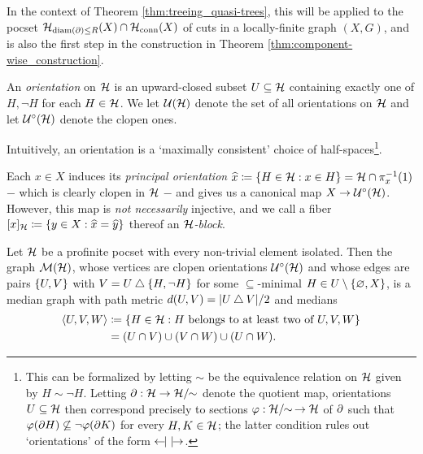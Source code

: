 \documentclass[reqno]{amsart}
\begin{document}
    In the context of Theorem \ref{thm:treeing_quasi-trees}, this will be applied to the pocset $\mathcal{H}_{\operatorname{diam}(\partial)\leq R}(X)\cap\mathcal{H}_\mathrm{conn}(X)$ of cuts in a locally-finite graph $(X,G)$, and is also the first step in the construction in Theorem \ref{thm:component-wise_construction}.
    
    \begin{definition}\label{def:orientation}
        An \textit{orientation} on $\mathcal{H}$ is an upward-closed subset $U\subseteq\mathcal{H}$ containing exactly one of $H,\lnot H$ for each $H\in\mathcal{H}$. We let $\mathcal{U}(\mathcal{H})$ denote the set of all orientations on $\mathcal{H}$ and let $\mathcal{U}^\circ(\mathcal{H})$ denote the clopen ones.

        Intuitively, an orientation is a `maximally consistent' choice of half-spaces\footnote{This can be formalized by letting $\sim$ be the equivalence relation on $\mathcal{H}$ given by $H\sim\lnot H$. Letting $\partial:\mathcal{H}\to\mathcal{H}/\!\!\sim$ denote the quotient map, orientations $U\subseteq\mathcal{H}$ then correspond precisely to sections $\varphi:\mathcal{H}/\!\!\sim\,\to\mathcal{H}$ of $\partial$ such that $\varphi(\partial H)\not\subseteq\lnot\varphi(\partial K)$ for every $H,K\in\mathcal{H}$; the latter condition rules out `orientations' of the form $\leftarrow\hspace{-4.15pt}|\,\,|\hspace{-4.15pt}\rightarrow$.}.
    \end{definition}

    \begin{example}
        Each $x\in X$ induces its \textit{principal orientation} $\widehat{x}\coloneqq\left\{H\in\mathcal{H}: x\in H\right\}=\mathcal{H}\cap\pi^{-1}_x(1)$ $-$ which is clearly clopen in $\mathcal{H}$ $-$ and gives us a canonical map $X\to\mathcal{U}^\circ(\mathcal{H})$. However, this map is \textit{not necessarily} injective, and we call a fiber $[x]_{\mathcal{H}}\coloneqq\left\{y\in X:\widehat{x}=\widehat{y}\right\}$ thereof an \textit{$\mathcal{H}$-block}.
    \end{example}

    \begin{proposition}\label{prp:construction_of_dual_median_graph}
        Let $\mathcal{H}$ be a profinite pocset with every non-trivial element isolated. Then the graph $\mathcal{M}(\mathcal{H})$, whose vertices are clopen orientations $\mathcal{U}^\circ(\mathcal{H})$ and whose edges are pairs $\left\{U,V\right\}$ with $V=U\bigtriangleup\left\{H,\lnot H\right\}$ for some $\subseteq$-minimal $H\in U\setminus\left\{\varnothing,X\right\}$, is a median graph with path metric $d(U,V)=|U\bigtriangleup V|/2$ and medians
        \begin{equation*}
            \begin{aligned}
                \left\langle U,V,W\right\rangle&\coloneqq\left\{H\in\mathcal{H}: H\textrm{ belongs to at least two of }U,V,W\right\} \\
                                        &=(U\cap V)\cup(V\cap W)\cup(U\cap W).
            \end{aligned}
        \end{equation*}
    \end{proposition}
\end{document}
